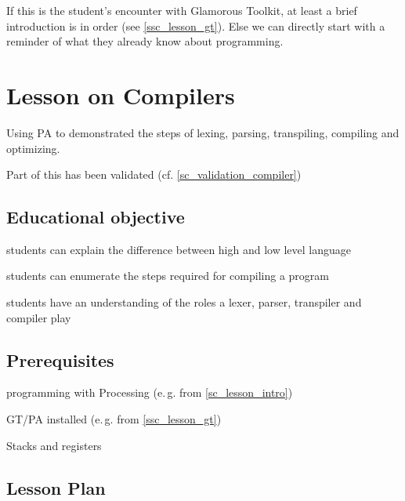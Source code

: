 If this is the student's encounter with Glamorous Toolkit, at least a brief introduction is in order (see \ref{ssc_lesson_gt}). Else we can directly start with a reminder of what they already know about programming.




\section{Lesson on Compilers} \label{sc_lesson_compiler}

Using PA to demonstrated the steps of lexing, parsing, transpiling, compiling and optimizing.

Part of this has been validated (cf. \ref{sc_validation_compiler})


\subsection{Educational objective}

\begin{todo}
\item students can explain the difference between high and low level language
\item students can enumerate the steps required for compiling a program
\item students have an understanding of the roles a lexer, parser, transpiler and compiler play
\end{todo}


\subsection{Prerequisites}

\begin{todo}
\item programming with Processing (e.\,g. from \ref{sc_lesson_intro})
\item GT/PA installed (e.\,g. from \ref{ssc_lesson_gt})
\item Stacks and registers
\end{todo}


\subsection{Lesson Plan}

